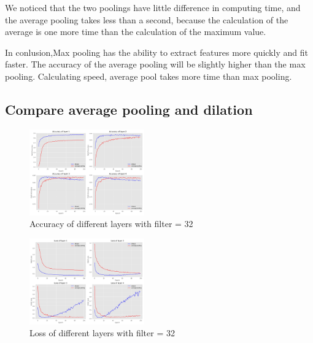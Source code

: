 \documentclass{article}
\begin{document}
We noticed that the two poolings have little difference in computing time, and the average pooling takes less than a second, because the calculation of the average is one more time than the calculation of the maximum value.

In conlusion,Max pooling has the ability to extract features more quickly and fit faster. The accuracy of the average pooling will be slightly higher than the max pooling. Calculating speed, average pool takes more time than max pooling.

\subsection{Compare average pooling  and dilation}



\begin{figure}[H] %
	\centering %
	\includegraphics[width=0.44\textwidth]{./pic/part2/dilated_average_layer_acc.pdf} %
	\caption{Accuracy of different layers with filter = 32} %
	\label{Fig.main2} %
\end{figure}

\begin{figure}[H] %
	\centering %
	\includegraphics[width=0.44\textwidth]{./pic/part2/dilated_average_layer_loss.pdf} %
	\caption{Loss of different layers with filter = 32} %
	\label{Fig.main2} %
\end{figure}
\end{document}
